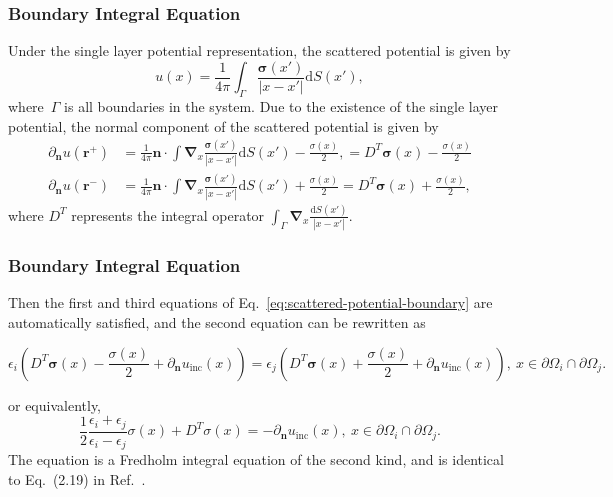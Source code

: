 \documentclass{beamer}
\newcommand{\M}[1]{\boldsymbol{#1}} %
\newcommand{\grad}{\M{\nabla}} %
\begin{document}
\begin{frame}
	\frametitle{Boundary Integral Equation}

    Under the single layer potential representation, the scattered potential is given by
    \begin{equation}
        u(x) = \frac{1}{4 \pi} \int_{\Gamma} \frac{\mathbf{\sigma}(x')}{|x - x'|} \mathrm{d}S(x'),
    \end{equation}
    where~$\Gamma$ is all boundaries in the system.
    Due to the existence of the single layer potential, the normal component of the scattered potential is given by
    \begin{equation}\label{eq:scattered-potential}
        \begin{split}
        \partial_{\mathbf{n}} u(\mathbf{r^+}) &= \frac{1}{4 \pi} \mathbf{n} \cdot \int \grad_{x} \frac{\mathbf{\sigma}(x')}{|x - x'|} \mathrm{d}S(x') - \frac{\sigma(x)}{2}, = D^T \mathbf{\sigma}(x) - \frac{\sigma(x)}{2} \\
        \partial_{\mathbf{n}} u(\mathbf{r^-}) &= \frac{1}{4 \pi} \mathbf{n} \cdot \int \grad_{x} \frac{\mathbf{\sigma}(x')}{|x - x'|} \mathrm{d}S(x') + \frac{\sigma(x)}{2} = D^T \mathbf{\sigma}(x) + \frac{\sigma(x)}{2},
        \end{split}
    \end{equation}
    where $D^T$ represents the integral operator $\int_{\Gamma} \grad_{x} \frac{\mathrm{d}S(x')}{|x - x'|}$.
\end{frame}

\begin{frame}
    \frametitle{Boundary Integral Equation}

    Then the first and third equations of Eq.~\eqref{eq:scattered-potential-boundary} are automatically satisfied, and the second equation can be rewritten as
    \begin{small}
        \begin{equation}
        \epsilon_i \left( D^T \mathbf{\sigma}(x) - \frac{\sigma(x)}{2} + \partial_{\mathbf{n}} u_{\text{inc}}(x) \right) = \epsilon_j \left( D^T \mathbf{\sigma}(x) + \frac{\sigma(x)}{2} + \partial_{\mathbf{n}} u_{\text{inc}}(x) \right),~x \in \partial \Omega_i \cap \partial \Omega_j.
        \end{equation}
    \end{small}
    or equivalently,
    \begin{equation}\label{eq:sl_equation}
        \frac{1}{2} \frac{\epsilon_i + \epsilon_j}{\epsilon_i - \epsilon_j} \sigma(x) + D^T \sigma(x) = - \partial_{\mathbf{n}} u_{\text{inc}}(x),~x \in \partial \Omega_i \cap \partial \Omega_j.
    \end{equation}
    The equation is a Fredholm integral equation of the second kind, and is identical to Eq.~(2.19) in Ref.~\cite{greengard1994numerical}.
\end{frame}
\end{document}
